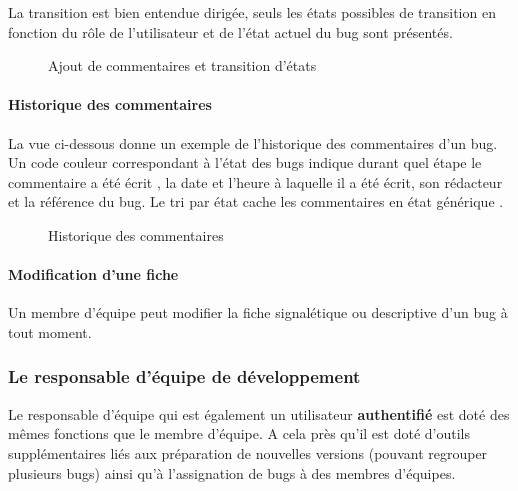 \documentclass{article}[12pt]
\begin{document}
 La transition est bien entendue dirigée, seuls les états possibles de transition en fonction du rôle de l'utilisateur et de l'état actuel du bug sont présentés.
\begin{figure}[H]
	\centering
	\caption{Ajout de commentaires et transition d'états}
\end{figure}

\paragraph{Historique des commentaires}
La vue ci-dessous donne un exemple de l'historique des commentaires d'un bug. Un code couleur correspondant à l'état des bugs indique durant quel étape le commentaire a été écrit , la date et l'heure à laquelle il a été écrit, son rédacteur et la référence du bug. Le tri par état cache les commentaires en état \og générique \fg.
\begin{figure}[H]
	\centering
	\caption{Historique des commentaires}
\end{figure}

 \paragraph{Modification d'une fiche}
 Un membre d'équipe peut modifier la fiche signalétique ou descriptive d'un bug à tout moment. 
\subsubsection{Le responsable d'équipe de développement}
\label{responsable}
Le responsable d'équipe qui est également un utilisateur \textbf{authentifié} est doté des mêmes fonctions que le membre d'équipe. A cela près qu'il est doté d'outils supplémentaires liés aux préparation de nouvelles versions (pouvant regrouper plusieurs bugs) ainsi qu'à l'assignation de bugs à des membres d'équipes. 
\end{document}

